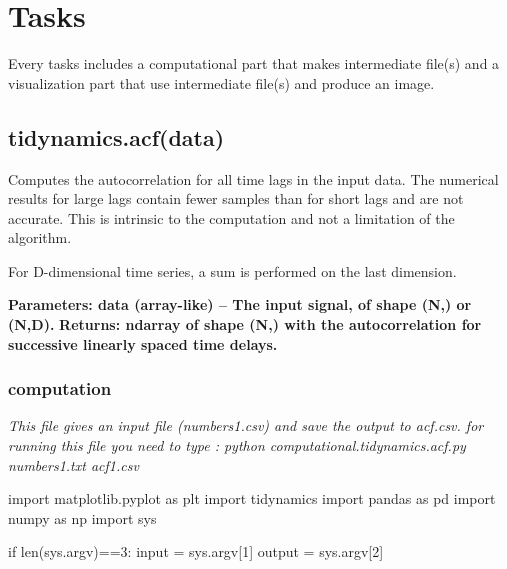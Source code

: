 \documentclass[12pt, a4paper, twoside]{report}
\begin{document}
\newpage
\section{Tasks}

Every tasks includes a computational part that makes intermediate file(s) and a visualization part that use intermediate file(s) and produce an image.  

\subsection{tidynamics.acf(data)}
Computes the autocorrelation for all time lags in the input data. The numerical results for large lags contain fewer samples than for short lags and are not accurate. This is intrinsic to the computation and not a limitation of the algorithm.

For D-dimensional time series, a sum is performed on the last dimension.

\textbf{ Parameters:	data (array-like) – The input signal, of shape (N,) or (N,D).}\newline
\textbf{ Returns:	ndarray of shape (N,) with the autocorrelation for successive linearly spaced time delays.}
 
\subsubsection{computation}
 
\textit{This file gives an input file (numbers1.csv) and save the output to acf.csv.\newline
for running this file you need to type : python computational.tidynamics.acf.py numbers1.txt acf1.csv\newline}



import matplotlib.pyplot as plt\newline
import tidynamics\newline
import pandas as pd\newline
import numpy as np\newline
import sys\newline

if len(sys.argv)==3:\newline
\hspace*{10mm} input = sys.argv[1]\newline
\hspace*{10mm} output = sys.argv[2]\newline
\end{document}
